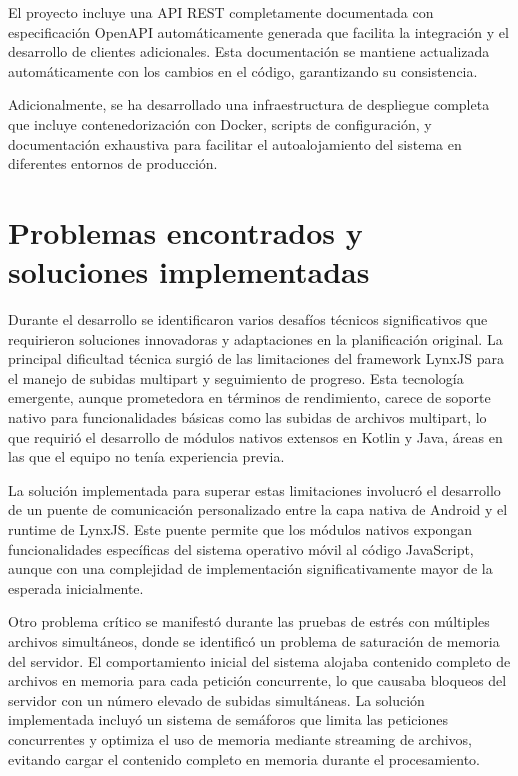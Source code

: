 El proyecto incluye una API REST completamente documentada con especificación OpenAPI automáticamente generada que facilita la integración y el desarrollo de clientes adicionales. Esta documentación se mantiene actualizada automáticamente con los cambios en el código, garantizando su consistencia.

Adicionalmente, se ha desarrollado una infraestructura de despliegue completa que incluye contenedorización con Docker, scripts de configuración, y documentación exhaustiva para facilitar el autoalojamiento del sistema en diferentes entornos de producción.

\section{Problemas encontrados y soluciones implementadas}

Durante el desarrollo se identificaron varios desafíos técnicos significativos que requirieron soluciones innovadoras y adaptaciones en la planificación original. La principal dificultad técnica surgió de las limitaciones del framework LynxJS para el manejo de subidas multipart y seguimiento de progreso. Esta tecnología emergente, aunque prometedora en términos de rendimiento, carece de soporte nativo para funcionalidades básicas como las subidas de archivos multipart, lo que requirió el desarrollo de módulos nativos extensos en Kotlin y Java, áreas en las que el equipo no tenía experiencia previa.

La solución implementada para superar estas limitaciones involucró el desarrollo de un puente de comunicación personalizado entre la capa nativa de Android y el runtime de LynxJS. Este puente permite que los módulos nativos expongan funcionalidades específicas del sistema operativo móvil al código JavaScript, aunque con una complejidad de implementación significativamente mayor de la esperada inicialmente.

Otro problema crítico se manifestó durante las pruebas de estrés con múltiples archivos simultáneos, donde se identificó un problema de saturación de memoria del servidor. El comportamiento inicial del sistema alojaba contenido completo de archivos en memoria para cada petición concurrente, lo que causaba bloqueos del servidor con un número elevado de subidas simultáneas. La solución implementada incluyó un sistema de semáforos que limita las peticiones concurrentes y optimiza el uso de memoria mediante streaming de archivos, evitando cargar el contenido completo en memoria durante el procesamiento.

